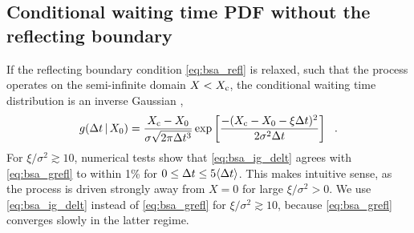 \begin{subappendices}
\section{Conditional waiting time PDF without the reflecting boundary}
\label{sec:bsa_norefl}
If the reflecting boundary condition \eqref{eq:bsa_refl} is relaxed, such that the process operates on the semi-infinite domain $X < X_\textrm{c}$, the conditional waiting time distribution is an inverse Gaussian \citep{Cox1965}, 
\begin{equation}
\label{eq:bsa_ig_delt}
g(\Delta t \,|\, X_0) = \frac{X_\textrm{c} - X_0}{\sigma\sqrt{2\pi \Delta t^{3}}} \exp \left[ \frac{-(X_\textrm{c} - X_0 - \xi \Delta t)^2}{2 \sigma^2 \Delta t} \right]\ \ .
\end{equation}
For $\xi/\sigma^2 \gtrsim 10$, numerical tests show that \eqref{eq:bsa_ig_delt} agrees with \eqref{eq:bsa_grefl} to within 1\% for $0 \leq \Delta t \leq 5 \langle \Delta t \rangle$. This makes intuitive sense, as the process is driven strongly away from $X = 0$ for large $\xi/\sigma^2 > 0$. We use \eqref{eq:bsa_ig_delt} instead of \eqref{eq:bsa_grefl} for $\xi/\sigma^2 \gtrsim 10$, because \eqref{eq:bsa_grefl} converges slowly in the latter regime.

\end{subappendices}
